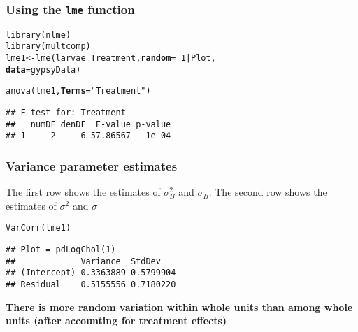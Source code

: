 \documentclass[color=usenames,dvipsnames]{beamer}\usepackage[]{graphicx}\usepackage[]{color}
\makeatletter
\newcommand{\hlnum}[1]{\textcolor[rgb]{0.69,0.494,0}{#1}}%
\newcommand{\hlstr}[1]{\textcolor[rgb]{0.749,0.012,0.012}{#1}}%
\newcommand{\hlopt}[1]{\textcolor[rgb]{0,0,0}{#1}}%
\newcommand{\hlstd}[1]{\textcolor[rgb]{0,0,0}{#1}}%
\newcommand{\hlkwb}[1]{\textcolor[rgb]{0,0.341,0.682}{#1}}%
\newcommand{\hlkwc}[1]{\textcolor[rgb]{0,0,0}{\textbf{#1}}}%
\newcommand{\hlkwd}[1]{\textcolor[rgb]{0.004,0.004,0.506}{#1}}%
\newenvironment{kframe}{%
 \def\at@end@of@kframe{}%
 \ifinner\ifhmode%
  \def\at@end@of@kframe{\end{minipage}}%
  \begin{minipage}{\columnwidth}%
 \fi\fi%
 \def\FrameCommand##1{\hskip\@totalleftmargin \hskip-\fboxsep
 \colorbox{shadecolor}{##1}\hskip-\fboxsep
     \hskip-\linewidth \hskip-\@totalleftmargin \hskip\columnwidth}%
 \MakeFramed {\advance\hsize-\width
   \@totalleftmargin\z@ \linewidth\hsize
   \@setminipage}}%
 {\par\unskip\endMakeFramed%
 \at@end@of@kframe}
\newenvironment{knitrout}{}{} %
\makeatother
\begin{document}
\begin{frame}[fragile]
  \frametitle{Using the {\tt lme} function}
\begin{knitrout}
\color{fgcolor}\begin{kframe}
\begin{alltt}
\hlkwd{library}\hlstd{(nlme)}
\hlkwd{library}\hlstd{(multcomp)}
\hlstd{lme1} \hlkwb{<-} \hlkwd{lme}\hlstd{(larvae} \hlopt{~} \hlstd{Treatment,} \hlkwc{random}\hlstd{=}\hlopt{~}\hlnum{1}\hlopt{|}\hlstd{Plot,}
            \hlkwc{data}\hlstd{=gypsyData)}
\end{alltt}
\end{kframe}
\end{knitrout}
\pause
\vfill
\begin{knitrout}
\color{fgcolor}\begin{kframe}
\begin{alltt}
\hlkwd{anova}\hlstd{(lme1,} \hlkwc{Terms}\hlstd{=}\hlstr{"Treatment"}\hlstd{)}
\end{alltt}
\begin{verbatim}
## F-test for: Treatment 
##   numDF denDF  F-value p-value
## 1     2     6 57.86567   1e-04
\end{verbatim}
\end{kframe}
\end{knitrout}
\end{frame}






\begin{frame}[fragile]
  \frametitle{Variance parameter estimates}
  \small
  The first row shows the estimates of $\sigma^2_B$ and
  $\sigma_B$. The second row shows the estimates of $\sigma^2$ and $\sigma$
\begin{knitrout}
\color{fgcolor}\begin{kframe}
\begin{alltt}
\hlkwd{VarCorr}\hlstd{(lme1)}
\end{alltt}
\begin{verbatim}
## Plot = pdLogChol(1) 
##             Variance  StdDev   
## (Intercept) 0.3363889 0.5799904
## Residual    0.5155556 0.7180220
\end{verbatim}
\end{kframe}
\end{knitrout}
 \pause
 \vfill
 \centering
 \bf
  There is more random variation within whole units than among whole
  units (after accounting for treatment effects) \\
\end{frame}
\end{document}
